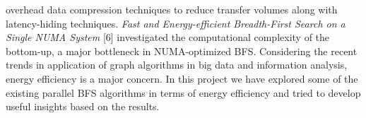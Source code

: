 overhead data compression techniques to reduce transfer volumes along with 
latency-hiding techniques.\newline
\emph{Fast and Energy-efficient Breadth-First Search
 on a Single NUMA System} [6] investigated the computational complexity of the bottom-up,
a major bottleneck in NUMA-optimized BFS.\newline
Considering the recent trends in application of graph algorithms in big data
and information analysis, energy efficiency is a major concern. In this project
we have explored some of the existing parallel BFS algorithms in terms of
energy efficiency and tried to develop useful insights based on the results.

